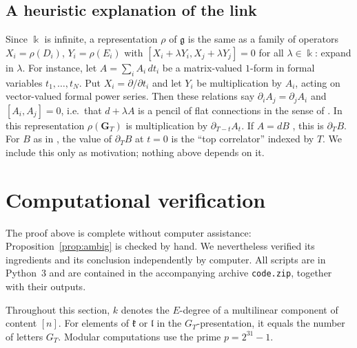 \documentclass[11pt]{amsart}
\theoremstyle{definition}
\theoremstyle{remark}
\newcommand{\kk}{\Bbbk}
\newcommand{\g}{\mathfrak{g}}
\newcommand{\lie}{\mathfrak{l}}
\newcommand{\kr}{\mathfrak{k}}
\begin{document}
\subsection*{A heuristic explanation of the link}
Since $\kk$ is infinite, a representation $\rho$ of $\g$ is the same as a family of operators $X_i=\rho(D_i)$, $Y_i=\rho(E_i)$ with $[X_i+\lambda Y_i,X_j+\lambda Y_j]=0$ for all $\lambda\in\kk$: expand in $\lambda$. For instance, let $A=\sum_iA_i\,dt_i$ be a matrix-valued $1$-form in formal variables $t_1,\dots,t_N$. Put $X_i=\partial/\partial t_i$ and let $Y_i$ be multiplication by $A_i$, acting on vector-valued formal power series. Then these relations say $\partial_iA_j=\partial_jA_i$ and $[A_i,A_j]=0$, i.e.\ that $d+\lambda A$ is a pencil of flat connections in the sense of \cite[\S3.1--3.2]{LM}. In this representation $\rho(\mathbf G_T)$ is multiplication by $\partial_{T-t}A_t$. If $A=dB$ \cite[Prop.~3.2]{LM}, this is $\partial_TB$. For $B$ as in \cite[(3.19)]{LM}, the value of $\partial_TB$ at $t=0$ is the ``top correlator'' indexed by $T$. We include this only as motivation; nothing above depends on it.

\section{Computational verification}\label{sec:computations}

The proof above is complete without computer assistance: Proposition~\ref{prop:ambig} is checked by hand. We nevertheless verified its ingredients and its conclusion independently by computer. All scripts are in Python~3 and are contained in the accompanying archive \texttt{code.zip}, together with their outputs.

Throughout this section, $k$ denotes the $E$-degree of a multilinear component of content $[n]$. For elements of $\kr$ or $\lie$ in the $G_T$-presentation, it equals the number of letters $G_T$. Modular computations use the prime $p=2^{31}-1$.
\end{document}
